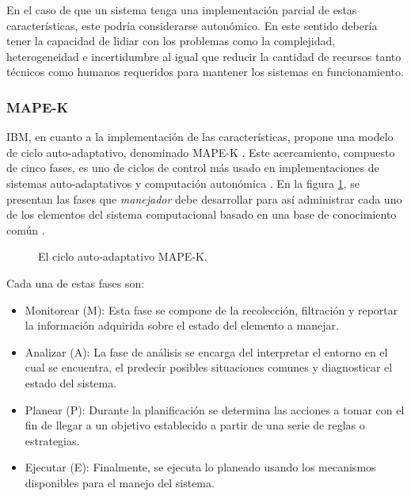 \documentclass[12pt]{article}
\begin{document}
    En el caso de que un sistema tenga una implementación parcial de estas características, este podría considerarse autonómico. En este sentido debería tener la capacidad de lidiar con los problemas como la complejidad, heterogeneidad e incertidumbre \cite{emerging_2005} al igual que reducir la cantidad de recursos tanto técnicos como humanos requeridos para mantener los sistemas en funcionamiento.
    
    \subsubsection*{MAPE-K}


    IBM, en cuanto a la implementación de las características, propone una modelo de ciclo auto-adaptativo, denominado MAPE-K \cite{Krikava2013}. Este acercamiento, compuesto de cinco fases, es uno de ciclos de control más usado en implementaciones de sistemas auto-adaptativos y computación autonómica \cite{Arcaini_2015}. En la figura \ref{fig:mapek}, se presentan las fases que \textit{manejador} debe desarrollar para así administrar cada uno de los elementos del sistema computacional basado en una base de conocimiento común \cite{alessandra_2010}. 

    \begin{figure}[H]
        \centering
        
        \caption{El ciclo auto-adaptativo MAPE-K.} \cite{alessandra_2010}
        \label{fig:mapek}
    \end{figure}

    Cada una de estas fases son:

    \begin{itemize}
        \item Monitorear (M): Esta fase se compone de la recolección, filtración y reportar la información adquirida sobre el estado del elemento a manejar.
        \item Analizar (A): La fase de análisis se encarga del interpretar el entorno en el cual se encuentra, el predecir posibles situaciones comunes y diagnosticar el estado del sistema.
        \item Planear (P): Durante la planificación se determina las acciones a tomar con el fin de llegar a un objetivo establecido a partir de una serie de reglas o estrategias.
        \item Ejecutar (E): Finalmente, se ejecuta lo planeado usando los mecanismos disponibles para el manejo del sistema. 
    \end{itemize}
\end{document}
